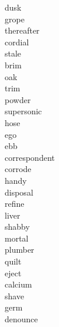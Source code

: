 \documentclass[a4paper, 11pt]{ctexart}
\begin{document}
\begin{multicols*}{3}
\begin{description}
\item[dusk]

\item[grope]

\item[thereafter]

\item[cordial]

\item[stale]

\item[brim]

\item[oak]

\item[trim]

\item[powder]

\item[supersonic]

\item[hose]

\item[ego]

\item[ebb]

\item[correspondent]

\item[corrode]

\item[handy]

\item[disposal]

\item[refine]

\item[liver]

\item[shabby]

\item[mortal]

\item[plumber]

\item[quilt]

\item[eject]

\item[calcium]

\item[shave]

\item[germ]

\item[denounce]


\end{description}
\end{multicols*}
\end{document}
